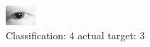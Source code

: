 \begin{figure}[h!]
\begin{center}
\includegraphics[width=0.60\columnwidth]{figures/ID119_class_4_target_3.png}
\end{center}
\caption{ Classification: 4 actual target: 3}
\label{fig:ID119_class_4_target_3}
\end{figure}

